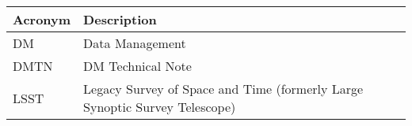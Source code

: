 \addtocounter{table}{-1}
\begin{longtable}{p{}p{}}\hline
\textbf{Acronym} & \textbf{Description}  \\\hline

DM & Data Management \\\hline
DMTN & DM Technical Note \\\hline
LSST & Legacy Survey of Space and Time (formerly Large Synoptic Survey Telescope) \\\hline
\end{longtable}
